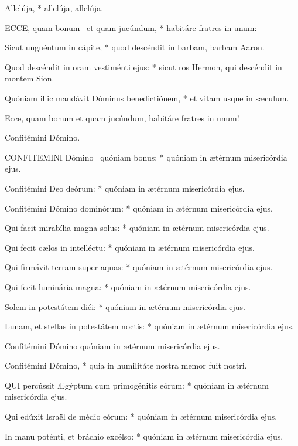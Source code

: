  Allelúja, * allelúja, allelúja.


\lettrine[lines=2]{E}{CCE}, quam bonum \textdagger\ et quam jucúndum, * habitáre fratres in unum: \textdaggerdbl

Sicut unguéntum in cápite, * quod descéndit in barbam, barbam Aaron.

Quod descéndit in oram vestiménti ejus: * sicut ros Hermon, qui descéndit in montem Sion.

Quóniam illic mandávit Dóminus benedictiónem, * et vitam usque in sæculum.

 Ecce, quam bonum et quam jucúndum, habitáre fratres in unum!

 Confitémini Dómino.


\lettrine[lines=2]{C}{ONFITEMINI} Dómino \textdagger\ quóniam bonus: * quóniam in ætérnum misericórdia ejus.

Confitémini Deo deórum: * quóniam in ætérnum misericórdia ejus.

Confitémini Dómino dominórum: * quóniam in ætérnum misericórdia ejus.

Qui facit mirabília magna solus: * quóniam in ætérnum misericórdia ejus.

Qui fecit cælos in intelléctu: * quóniam in ætérnum misericórdia ejus.

Qui firmávit terram super aquas: * quóniam in ætérnum misericórdia ejus.

Qui fecit luminária magna: * quóniam in ætérnum misericórdia ejus.

Solem in potestátem diéi: * quóniam in ætérnum misericórdia ejus.

Lunam, et stellas in potestátem noctis: * quóniam in ætérnum misericórdia ejus.

 Confitémini Dómino quóniam in ætérnum misericórdia ejus.

 Confitémini Dómino, * quia in humilitáte nostra memor fuit nostri.


\lettrine[lines=2]{Q}{UI} percússit Ægýptum cum primogénitis eórum: * quóniam in ætérnum misericórdia ejus.

Qui edúxit Israël de médio eórum: * quóniam in ætérnum misericórdia ejus.

In manu poténti, et bráchio excélso: * quóniam in ætérnum misericórdia ejus.

